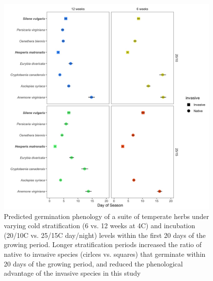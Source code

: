 \documentclass{article}\usepackage[]{graphicx}\usepackage[]{color}
\begin{document}
\begin{figure}[h!]
    \centering
\includegraphics[width=\textwidth]{..//figure/commchange.jpeg}
   \caption{Predicted germination phenology of a suite of temperate herbs under varying cold stratification (6 vs. 12 weeks at 4\degree C) and incubation (20/10\degree C  vs. 25/15\degree C day/night) levels within the first 20 days of the growing period. Longer stratification periods increased the ratio of native to invasive species (cirlces vs. squares) that germinate within 20 days of the growing period, and reduced the phenological advantage of the invasive species in this study } 
   \label{fig:comm}
\end{figure}



\end{document}
